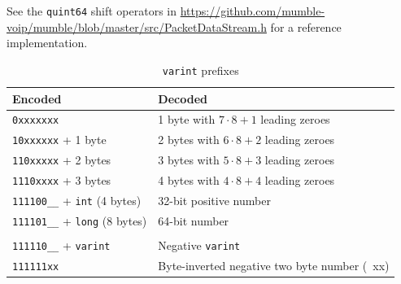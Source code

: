 \documentclass[11pt]{article} %
\DeclareMathOperator{\append}{\triangleright}
\begin{document}
See the \texttt{quint64} shift operators in \url{https://github.com/mumble-voip/mumble/blob/master/src/PacketDataStream.h} for a reference implementation.

\begin{table}[H]\begin{center}
	\caption{\texttt{varint} prefixes}\label{tbl:varint}

	\begin{tabular}{ll}
		Encoded & Decoded \\
		\hline
		\texttt{0xxxxxxx} & 1 byte with $7 \cdot 8 + 1$ leading zeroes \\
		\texttt{10xxxxxx} + 1 byte & 2 bytes with $6 \cdot 8 + 2$ leading zeroes \\
		\texttt{110xxxxx} + 2 bytes & 3 bytes with $5 \cdot 8 + 3$ leading zeroes \\
		\texttt{1110xxxx} + 3 bytes & 4 bytes with $4 \cdot 8 + 4$ leading zeroes \\
		\texttt{111100\_\_} + \texttt{int} (4 bytes) & 32-bit positive number \\
		\texttt{111101\_\_} + \texttt{long} (8 bytes) & 64-bit number \\
\\
		\texttt{111110\_\_} + \texttt{varint} & Negative \texttt{varint} \\
		\texttt{111111xx} & Byte-inverted negative two byte number (~xx) \\
	\end{tabular}
\end{center}\end{table}

\end{document}
